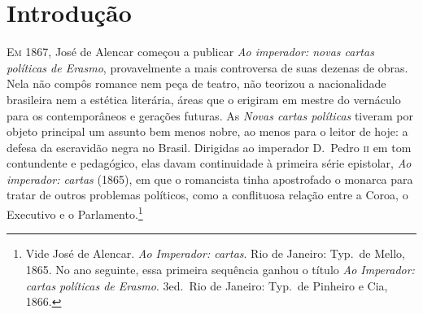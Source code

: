 \chapter[Introdução, por Tâmis Parron]{Introdução}

\noindent\textsc{Em 1867,} José de Alencar começou a publicar \textit{Ao imperador: novas
cartas políticas de Erasmo}, provavelmente a mais controversa de suas
dezenas de obras. Nela não compôs romance nem peça de teatro, não
teorizou a nacionalidade brasileira nem a estética literária, áreas que
o erigiram em mestre do vernáculo para os contemporâneos e gerações
futuras. As \textit{Novas cartas políticas} tiveram por objeto
principal um assunto bem menos nobre, ao menos para o leitor de hoje: a
defesa da escravidão negra no Brasil. Dirigidas ao imperador D.~Pedro
\textsc{ii} em tom contundente e pedagógico, elas davam continuidade à primeira
série epistolar, \textit{Ao imperador: cartas} (1865), em que o
romancista tinha apostrofado o monarca para tratar de outros problemas
políticos, como a conflituosa relação entre a Coroa, o Executivo e o
Parlamento.\footnote{ Vide José de Alencar. \textit{Ao Imperador:
cartas}. Rio de Janeiro: Typ.~de Mello, 1865. No ano seguinte, essa
primeira sequência ganhou o título \textit{Ao Imperador: cartas
políticas de Erasmo}. 3\ai ed.~Rio de Janeiro: Typ.~de Pinheiro e Cia, 1866.} 

